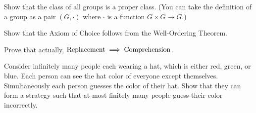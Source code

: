\begin{problem}
	Show that the class of all groups is a proper class.
	(You can take the definition of a group as a pair $(G, \cdot)$
	where $\cdot$ is a function $G \times G \to G$.)
\end{problem}
\begin{problem}
	Show that the Axiom of Choice follows from the Well-Ordering Theorem.
\end{problem}

\begin{dproblem}
	Prove that actually, $\mathrm{Replacement} \implies \mathrm{Comprehension}$.
\end{dproblem}

\begin{problem}
	Consider infinitely many people each wearing a hat,
	which is either red, green, or blue.
	Each person can see the hat color of everyone except themselves.
	Simultaneously each person guesses the color of their hat.
	Show that they can form a strategy such that at most finitely many people guess their color incorrectly. 
\end{problem}

